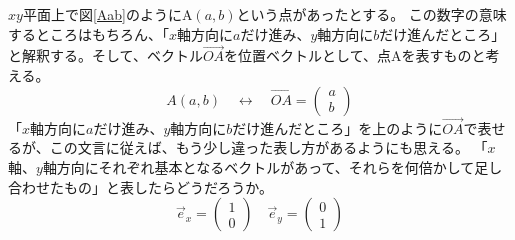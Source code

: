 \documentclass[10pt]{jsreport}
\theoremstyle{definition}%
\newcommand{\vc}[1]{\overrightarrow{#1}}%
\numberwithin{equation}{section}%
\begin{document}
$xy$平面上で図\ref{Aab}のようにA$(a,b)$という点があったとする。
この数字の意味するところはもちろん、「$x$軸方向に$a$だけ進み、$y$軸方向に$b$だけ進んだところ」と解釈する。そして、ベクトル$\vc{OA}$を位置ベクトルとして、点Aを表すものと考える。
\begin{equation}
  A(a,b)\quad\leftrightarrow\quad \vc{OA}=\left(\begin{matrix}
    a\\
    b
  \end{matrix}\right)
\end{equation}
「$x$軸方向に$a$だけ進み、$y$軸方向に$b$だけ進んだところ」を上のように$\vc{OA}$で表せるが、この文言に従えば、もう少し違った表し方があるようにも思える。
「$x$軸、$y$軸方向にそれぞれ基本となるベクトルがあって、それらを何倍かして足し合わせたもの」と表したらどうだろうか。
\begin{equation}
  \vec{e}_{x}=\left(\begin{matrix}
    1\\
    0
  \end{matrix}\right)\quad \vec{e}_{y}=\left(\begin{matrix}
    0\\
    1
  \end{matrix}\right)
\end{equation}
\end{document}
